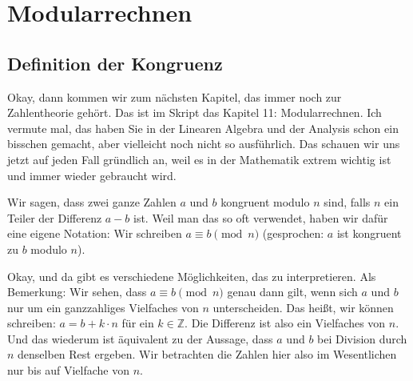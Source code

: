 \section{Modularrechnen}
\subsection{Definition der Kongruenz}

\begin{spoken-clean}[01:16:40 - 01:18:25]
Okay, dann kommen wir zum nächsten Kapitel, das immer noch zur Zahlentheorie gehört. Das ist im Skript das Kapitel 11: Modularrechnen. Ich vermute mal, das haben Sie in der Linearen Algebra und der Analysis schon ein bisschen gemacht, aber vielleicht noch nicht so ausführlich. Das schauen wir uns jetzt auf jeden Fall gründlich an, weil es in der Mathematik extrem wichtig ist und immer wieder gebraucht wird.

Wir sagen, dass zwei ganze Zahlen $a$ und $b$ kongruent modulo $n$ sind, falls $n$ ein Teiler der Differenz $a - b$ ist. Weil man das so oft verwendet, haben wir dafür eine eigene Notation: Wir schreiben $a \equiv b \pmod n$ (gesprochen: $a$ ist kongruent zu $b$ modulo $n$).

Okay, und da gibt es verschiedene Möglichkeiten, das zu interpretieren. Als Bemerkung: Wir sehen, dass $a \equiv b \pmod n$ genau dann gilt, wenn sich $a$ und $b$ nur um ein ganzzahliges Vielfaches von $n$ unterscheiden. Das heißt, wir können schreiben: $a = b + k \cdot n$ für ein $k \in \mathbb{Z}$. Die Differenz ist also ein Vielfaches von $n$. Und das wiederum ist äquivalent zu der Aussage, dass $a$ und $b$ bei Division durch $n$ denselben Rest ergeben. Wir betrachten die Zahlen hier also im Wesentlichen nur bis auf Vielfache von $n$.
\end{spoken-clean}

